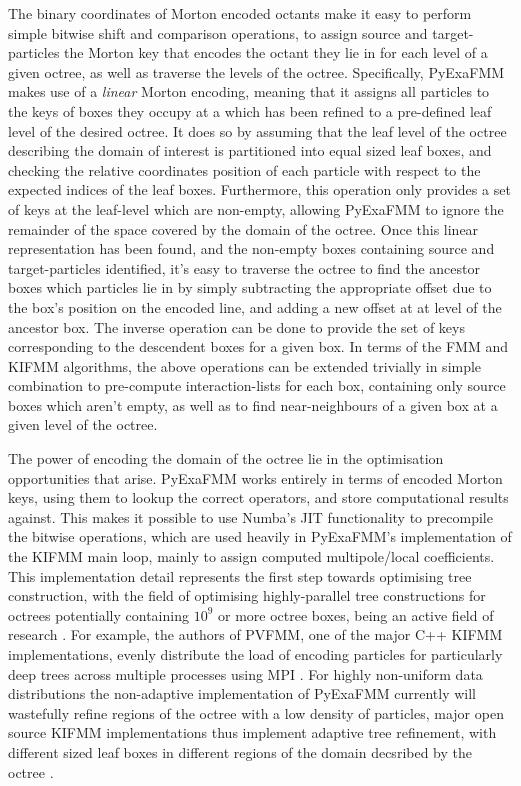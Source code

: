 The binary coordinates of Morton encoded octants make it easy to perform simple
bitwise shift and comparison operations, to assign source and \gls{target-particles} the Morton key
that encodes the octant they lie in for each level of a given octree, as well as traverse the levels of
the octree. Specifically, \gls{PyExaFMM} makes use of a \textit{linear} Morton encoding, meaning that it assigns
all particles to the keys of boxes they occupy at a which has been refined to a
pre-defined leaf level of the desired octree. It does so by assuming that the
leaf level of the octree describing the domain of interest is partitioned into equal
sized leaf boxes, and checking the relative coordinates position of each particle
with respect to the expected indices of the leaf boxes. Furthermore, this operation only provides
a set of keys at the leaf-level which are non-empty, allowing \gls{PyExaFMM} to
ignore the remainder of the space covered by the domain of the octree. Once this
linear representation has been found, and the non-empty boxes containing
source and \gls{target-particles} identified, it's easy to traverse the octree
to find the ancestor boxes which particles lie in by simply subtracting the appropriate
offset due to the box's position on the encoded line, and adding a new offset at
at level of the ancestor box. The inverse operation can be done to provide the set
of keys corresponding to the descendent boxes for a given box. In terms of the
\gls{FMM} and \gls{KIFMM} algorithms, the above operations can be extended trivially
in simple combination to pre-compute \gls{interaction-list}s for each box, containing
only source boxes which aren't empty, as well as to find \gls{near-neighbours} of
a given box at a given level of the octree.

The power of encoding the domain of the octree lie in the optimisation opportunities
that arise. \gls{PyExaFMM} works entirely in terms of encoded Morton keys, using
them to lookup the correct operators, and store computational results against.
This makes it possible to use Numba's \gls{JIT} functionality to precompile the bitwise
operations, which are used heavily in \gls{PyExaFMM}'s implementation of the \gls{KIFMM}
main loop, mainly to assign computed multipole/local coefficients. This implementation
detail represents the first step towards optimising tree construction, with the
field of optimising highly-parallel tree constructions for octrees potentially containing
$10^9$ or more octree boxes, being an active field of research \cite{Sundar:2008:SIAM,Malhotra:2015:CCP}.
For example, the authors of PVFMM, one of the major C++ \gls{KIFMM} implementations,
evenly distribute the load of encoding particles for particularly deep trees across
multiple processes using \gls{MPI} \cite{Malhotra:2015:CCP}. For highly non-uniform
data distributions the non-adaptive implementation of \gls{PyExaFMM} currently
will wastefully refine regions of the octree with a low density of particles, major
open source \gls{KIFMM} implementations thus implement adaptive tree refinement,
with different sized leaf boxes in different regions of the domain decsribed by
the octree \cite{Ying:2004:JCP, Malhotra:2015:CCP, exafmm}.

